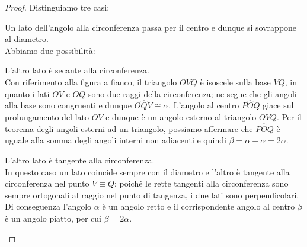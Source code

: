 \begin{proof}
Distinguiamo tre casi:
\begin{enumerate*}
\item Un lato dell'angolo alla circonferenza passa per il centro e dunque si sovrappone al diametro.\\
Abbiamo due possibilità:
\begin{enumerate*}
\item L'altro lato è secante alla circonferenza.\\
Con riferimento alla figura a fianco, il triangolo $OVQ$ è isoscele sulla base $VQ$, in quanto i lati $OV$ e $OQ$ sono due raggi della circonferenza; ne segue che gli angoli alla base sono congruenti e dunque $O\widehat{Q}V\cong \alpha$. L'angolo al centro $P\widehat{O}Q$ giace sul prolungamento del lato $OV$ e dunque è un angolo esterno al triangolo $OVQ$. Per il teorema degli angoli esterni ad un triangolo, possiamo affermare che $P\widehat{O}Q$ è uguale alla somma degli angoli interni non adiacenti e quindi $\beta = \alpha + \alpha = 2\alpha$.
\item L'altro lato è tangente alla circonferenza.\\
In questo caso un lato coincide sempre con il diametro e l'altro è tangente alla circonferenza nel punto $V\equiv Q$; poiché le rette tangenti alla circonferenza sono sempre ortogonali al raggio nel punto di tangenza, i due lati sono perpendicolari. Di conseguenza l'angolo $\alpha$ è un angolo retto e il corrispondente angolo al centro $\beta$ è un angolo piatto, per cui $\beta = 2\alpha$.
\end{enumerate*}


\end{enumerate*}
\end{proof}
